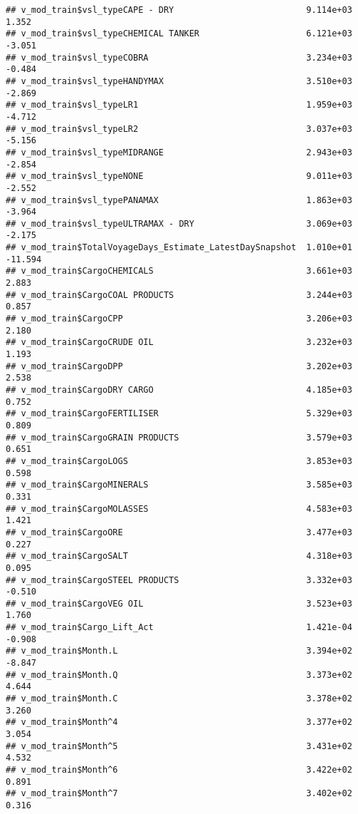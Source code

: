 \documentclass[]{article}
\begin{document}
\begin{verbatim}
## v_mod_train$vsl_typeCAPE - DRY                          9.114e+03   1.352
## v_mod_train$vsl_typeCHEMICAL TANKER                     6.121e+03  -3.051
## v_mod_train$vsl_typeCOBRA                               3.234e+03  -0.484
## v_mod_train$vsl_typeHANDYMAX                            3.510e+03  -2.869
## v_mod_train$vsl_typeLR1                                 1.959e+03  -4.712
## v_mod_train$vsl_typeLR2                                 3.037e+03  -5.156
## v_mod_train$vsl_typeMIDRANGE                            2.943e+03  -2.854
## v_mod_train$vsl_typeNONE                                9.011e+03  -2.552
## v_mod_train$vsl_typePANAMAX                             1.863e+03  -3.964
## v_mod_train$vsl_typeULTRAMAX - DRY                      3.069e+03  -2.175
## v_mod_train$TotalVoyageDays_Estimate_LatestDaySnapshot  1.010e+01 -11.594
## v_mod_train$CargoCHEMICALS                              3.661e+03   2.883
## v_mod_train$CargoCOAL PRODUCTS                          3.244e+03   0.857
## v_mod_train$CargoCPP                                    3.206e+03   2.180
## v_mod_train$CargoCRUDE OIL                              3.232e+03   1.193
## v_mod_train$CargoDPP                                    3.202e+03   2.538
## v_mod_train$CargoDRY CARGO                              4.185e+03   0.752
## v_mod_train$CargoFERTILISER                             5.329e+03   0.809
## v_mod_train$CargoGRAIN PRODUCTS                         3.579e+03   0.651
## v_mod_train$CargoLOGS                                   3.853e+03   0.598
## v_mod_train$CargoMINERALS                               3.585e+03   0.331
## v_mod_train$CargoMOLASSES                               4.583e+03   1.421
## v_mod_train$CargoORE                                    3.477e+03   0.227
## v_mod_train$CargoSALT                                   4.318e+03   0.095
## v_mod_train$CargoSTEEL PRODUCTS                         3.332e+03  -0.510
## v_mod_train$CargoVEG OIL                                3.523e+03   1.760
## v_mod_train$Cargo_Lift_Act                              1.421e-04  -0.908
## v_mod_train$Month.L                                     3.394e+02  -8.847
## v_mod_train$Month.Q                                     3.373e+02   4.644
## v_mod_train$Month.C                                     3.378e+02   3.260
## v_mod_train$Month^4                                     3.377e+02   3.054
## v_mod_train$Month^5                                     3.431e+02   4.532
## v_mod_train$Month^6                                     3.422e+02   0.891
## v_mod_train$Month^7                                     3.402e+02   0.316

\end{verbatim}
\end{document}
